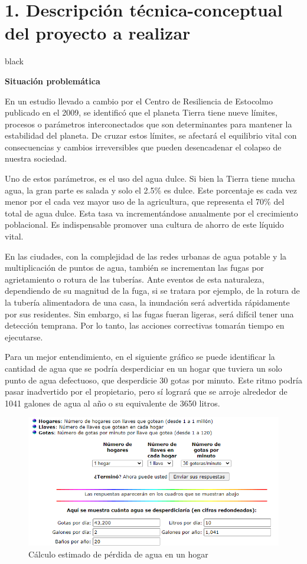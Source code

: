 \documentclass[
11pt, %
codirector, %
]{charter}
\begin{document}
\section{1. Descripción técnica-conceptual del proyecto a realizar}
\label{sec:descripcion}


\begin{consigna}{black} %

\textbf{Situación problemática} 

En un estudio llevado a cambio por el Centro de Resiliencia de Estocolmo publicado en el 2009, se identificó que el planeta Tierra tiene nueve límites, procesos o parámetros interconectados que son determinantes para mantener la estabilidad del planeta. De cruzar estos límites, se afectará el equilibrio vital con consecuencias y cambios irreversibles que pueden desencadenar el colapso de nuestra sociedad.

Uno de estos parámetros, es el uso del agua dulce. Si bien la Tierra tiene mucha agua, la gran parte es salada y solo el 2.5\% es dulce. Este porcentaje es cada vez menor por el cada vez mayor uso de la agricultura, que representa el 70\% del total de agua dulce. Esta tasa va incrementándose anualmente por el crecimiento poblacional. Es indispensable promover una cultura de ahorro de este líquido vital.

En las ciudades, con la complejidad de las redes urbanas de agua potable y la multiplicación de puntos de agua, también se incrementan las fugas por agrietamiento o rotura de las tuberías. Ante eventos de esta naturaleza, dependiendo de su magnitud de la fuga, si se tratara por ejemplo, de la rotura de la tubería alimentadora de una casa, la inundación será advertida rápidamente por sus residentes. Sin embargo, si las fugas fueran ligeras, será difícil tener una detección temprana. Por lo tanto, las acciones correctivas tomarán tiempo en ejecutarse.

Para un mejor entendimiento, en el siguiente gráfico se puede identificar la cantidad de agua que se podría desperdiciar en un hogar que tuviera un solo punto de agua defectuoso, que desperdicie 30 gotas por minuto. Este ritmo podría pasar inadvertido por el propietario, pero sí logrará que se arroje alrededor de 1041 galones de agua al año o su equivalente de 3650 litros.

\begin{figure}[htpb]
\centering 
\includegraphics[width=.8\textwidth]{./Figuras/consumoAgua.png}
\caption{Cálculo estimado de pérdida de agua en un hogar}
\label{fig:consumoAgua}
\end{figure}


\end{consigna}
\end{document}
